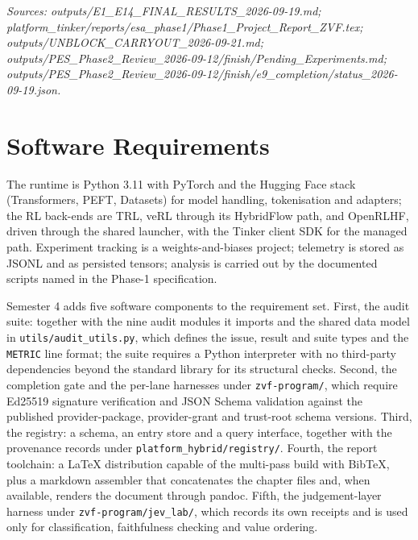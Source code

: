 \documentclass[12pt,a4paper]{report}
\newcommand{\longtok}[1]{\texttt{\seqsplit{#1}}}
\begin{document}
\emph{Sources: outputs/E1\_\allowbreak{}E14\_\allowbreak{}FINAL\_\allowbreak{}RESULTS\_\allowbreak{}2026-09-19.md;
platform\_tinker/reports/esa\_phase1/Phase1\_\allowbreak{}Project\_\allowbreak{}Report\_\allowbreak{}ZVF.tex;
outputs/UNBLOCK\_\allowbreak{}CARRYOUT\_\allowbreak{}2026-09-21.md;
outputs/PES\_\allowbreak{}Phase2\_\allowbreak{}Review\_\allowbreak{}2026-09-12/finish/Pending\_Experiments.md;
outputs/PES\_\allowbreak{}Phase2\_\allowbreak{}Review\_\allowbreak{}2026-09-12/finish/e9\_completion/status\_2026-09-19.json.}

\section{Software Requirements}\label{software-requirements}

The runtime is Python 3.11 with PyTorch and the Hugging Face stack
(Transformers, PEFT, Datasets) for model handling, tokenisation and
adapters; the RL back-ends are TRL, veRL through its HybridFlow path,
and OpenRLHF, driven through the shared launcher, with the Tinker client
SDK for the managed path. Experiment tracking is a weights-and-biases
project; telemetry is stored as JSONL and as persisted tensors; analysis
is carried out by the documented scripts named in the Phase-1
specification.

Semester 4 adds five software components to the requirement set. First,
the audit suite: \longtok{platform\_local/run\_\allowbreak{}all\_\allowbreak{}audits.py} together
with the nine audit modules it imports and the shared data model in
\texttt{utils/audit\_utils.py}, which defines the issue, result and
suite types and the \texttt{METRIC} line format; the suite requires a
Python interpreter with no third-party dependencies beyond the standard
library for its structural checks. Second, the completion gate and the
per-lane harnesses under \texttt{zvf-program/}, which require Ed25519
signature verification and JSON Schema validation against the published
provider-package, provider-grant and trust-root schema versions. Third,
the registry: a schema, an entry store and a query interface, together
with the provenance records under \texttt{platform\_hybrid/registry/}.
Fourth, the report toolchain: a LaTeX distribution capable of the
multi-pass build with BibTeX, plus a markdown assembler that
concatenates the chapter files and, when available, renders the document
through pandoc. Fifth, the judgement-layer harness under
\texttt{zvf-program/jev\_lab/}, which records its own receipts and is
used only for classification, faithfulness checking and value ordering.
\end{document}
